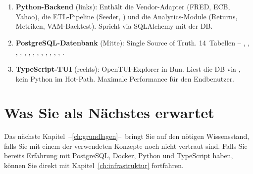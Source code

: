 \begin{enumerate}
  \item \textbf{Python-Backend} (links): Enthält die Vendor-Adapter
        (FRED, ECB, Yahoo), die ETL-Pipeline (Seeder, )
        und die Analytics-Module (Returns, Metriken, VAM-Backtest).
        Spricht via SQLAlchemy mit der DB.
  \item \textbf{PostgreSQL-Datenbank} (Mitte): Single Source of Truth.
        14~Tabellen -- , , ,
        , ,
        , , ,
        , , ,
        , , .
  \item \textbf{TypeScript-TUI} (rechts): OpenTUI-Explorer in Bun.
        Liest die DB via , kein Python im Hot-Path.
        Maximale Performance für den Endbenutzer.
\end{enumerate}

\section{Was Sie als Nächstes erwartet}

Das nächste Kapitel~--\ref{ch:grundlagen}--~bringt Sie auf den
nötigen Wissensstand, falls Sie mit einem der verwendeten Konzepte
noch nicht vertraut sind. Falls Sie bereits Erfahrung mit PostgreSQL,
Docker, Python und TypeScript haben, können Sie direkt mit
Kapitel~\ref{ch:infrastruktur} fortfahren.
